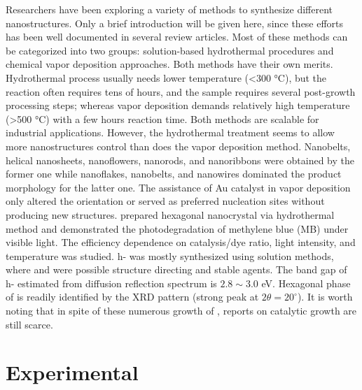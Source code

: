 Researchers have been exploring a variety of methods to synthesize different  nanostructures. Only a brief introduction will be given here, since these efforts has been well documented in several review articles.\cite{He2003} Most of these methods can be categorized into two groups: solution-based hydrothermal procedures \citep{Li2002b,Xia2006,Li2006a,Camacho-Bragado2006} and chemical vapor deposition approaches.\citep{Zeng1998,Li2002c,Li2002d,Zhou2003b,Fibers2007,Yan2009} Both methods have their own merits. Hydrothermal process usually needs lower temperature (\textless 300 \si{\degreeCelsius}), but the reaction often requires tens of hours, and the sample requires several post-growth processing steps; whereas vapor deposition demands relatively high temperature (\textgreater 500 \si{\degreeCelsius}) with a few hours reaction time. Both methods are scalable for industrial applications. However, the hydrothermal treatment seems to allow more  nanostructures control than does the vapor deposition method. Nanobelts,\cite{Li2002b} helical nanosheets, nanoflowers, nanorods,\cite{Li2006a} and nanoribbons\cite{Camacho-Bragado2006} were obtained by the former one while nanoflakes,\cite{Chen2009} nanobelts,\cite{Hu2009} and nanowires\citep{Zhou2003b,Chen2011b} dominated the product morphology for the latter one. The assistance of Au catalyst in vapor deposition only altered the orientation\cite{Yan2009} or served as preferred nucleation sites\cite{Cai2011} without producing new  structures. \citeauthor{Chithambararaj2013} prepared hexagonal  nanocrystal via hydrothermal method and demonstrated the photodegradation of methylene blue (MB) under visible light.\cite{Chithambararaj2013} The efficiency dependence on catalysis/dye ratio, light intensity, and temperature was studied. h- was mostly synthesized using solution methods, where  and  were possible structure directing and stable agents. The band gap of h- estimated from diffusion reflection spectrum is $2.8\sim3.0$ eV. Hexagonal phase of  is readily identified by the XRD pattern (strong peak at $2\theta=20^{\circ}$). It is worth noting that in spite of these numerous growth of , reports on catalytic growth are still scarce. 

\section{Experimental}\label{sec:grow}

